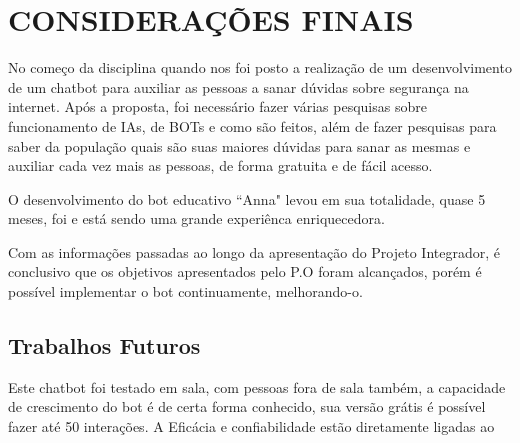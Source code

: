 \chapter{\uppercase{Considerações finais}}
\label{conclusao}

No começo da disciplina quando nos foi posto a realização de um desenvolvimento de um chatbot para auxiliar as pessoas a sanar dúvidas sobre segurança na internet. Após a proposta, foi necessário fazer várias pesquisas sobre funcionamento de IAs, de BOTs e como são feitos, além de fazer pesquisas para saber da população quais são suas maiores dúvidas para sanar as mesmas e auxiliar cada vez mais as pessoas, de forma gratuita e de fácil acesso.
 
 O desenvolvimento do bot educativo ``Anna" levou em sua totalidade, quase 5 meses, foi e está sendo uma grande experiênca enriquecedora.
 
 Com as informações passadas ao longo da apresentação do Projeto Integrador, é conclusivo que os objetivos apresentados pelo P.O foram alcançados, porém é possível implementar o bot continuamente, melhorando-o.
 
  \section{Trabalhos Futuros}
  
  Este chatbot foi testado em sala, com pessoas fora de sala também, a capacidade de crescimento do bot é de certa forma conhecido, sua versão grátis é possível fazer até 50 interações. A Eficácia e confiabilidade estão diretamente ligadas ao 